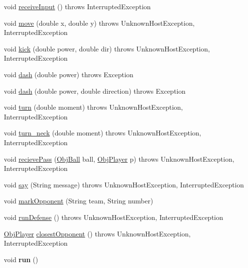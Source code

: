 \begin{DoxyCompactItemize}
void \hyperlink{classPlayer_a65f067086737b201d4183a1bb258e7ac}{receiveInput} ()  throws InterruptedException  
\item 
void \hyperlink{classPlayer_a787e2731a4ca14dcde043bad13633b89}{move} (double x, double y)  throws UnknownHostException, InterruptedException 
\item 
void \hyperlink{classPlayer_a515b5502a44f38e8fe8fe65f6601ee8f}{kick} (double power, double dir)  throws UnknownHostException, InterruptedException 
\item 
void \hyperlink{classPlayer_ab1823f2a23684dab547f9012c8e26b70}{dash} (double power)  throws Exception 
\item 
void \hyperlink{classPlayer_a16dea4b97be4347baf5dd9d973d651cf}{dash} (double power, double direction)  throws Exception 
\item 
void \hyperlink{classPlayer_aa1dd6cce198db61386b701b8520b512a}{turn} (double moment)  throws UnknownHostException, InterruptedException 
\item 
void \hyperlink{classPlayer_a3a1aac767e1da565b42b1fb027e2d848}{turn\_\-neck} (double moment)  throws UnknownHostException, InterruptedException 
\item 
void \hyperlink{classPlayer_a39c66a7fce40dacf016942aa0f40e831}{recievePass} (\hyperlink{classObjBall}{ObjBall} ball, \hyperlink{classObjPlayer}{ObjPlayer} p)  throws UnknownHostException, InterruptedException 
\item 
void \hyperlink{classPlayer_a1b324554699cfab5d15fff4ba242e396}{say} (String message)  throws UnknownHostException, InterruptedException 
\item 
void \hyperlink{classPlayer_ae6228d1bf70424d89e6a587326c86b46}{markOpponent} (String team, String number)
\item 
void \hyperlink{classPlayer_a399cde63b4187594789bee245f1f01a3}{runDefense} ()  throws UnknownHostException, InterruptedException 
\item 
\hyperlink{classObjPlayer}{ObjPlayer} \hyperlink{classPlayer_aa94877ea707329aee80c15163c184ef7}{closestOpponent} ()  throws UnknownHostException, InterruptedException 
\item 
\hypertarget{classPlayer_a499cc0cb1e2fb8bdb8139c8848b367b9}{
void {\bfseries run} ()}
\label{classPlayer_a499cc0cb1e2fb8bdb8139c8848b367b9}

\end{DoxyCompactItemize}
